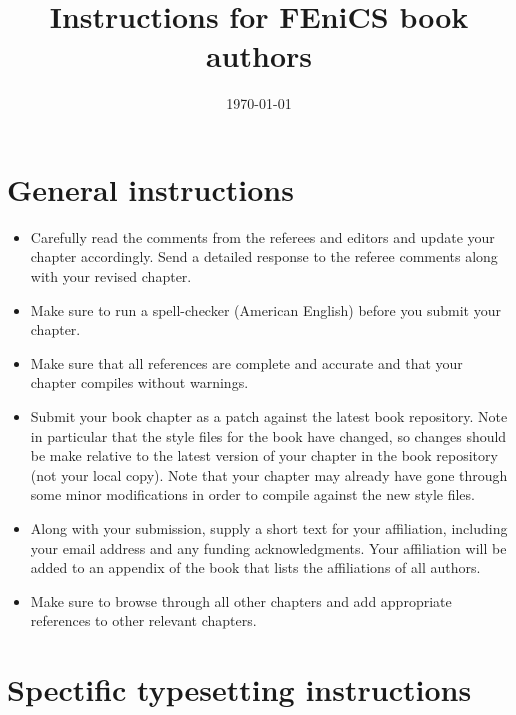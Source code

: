 \documentclass{article}
\title{Instructions for FEniCS book authors}
\date{\today}
\begin{document}
\maketitle

\section*{General instructions}

\begin{itemize}
\item
  Carefully read the comments from the referees and editors and update
  your chapter accordingly. Send a detailed response to the referee
  comments along with your revised chapter.
\item
  Make sure to run a spell-checker (American English) before you
  submit your chapter.
\item
  Make sure that all references are complete and accurate and that
  your chapter compiles without warnings.
\item
  Submit your book chapter as a patch against the latest book
  repository. Note in particular that the style files for the book
  have changed, so changes should be make relative to the latest
  version of your chapter in the book repository (not your local
  copy). Note that your chapter may already have gone through some
  minor modifications in order to compile against the new style files.
\item
  Along with your submission, supply a short text for your
  affiliation, including your email address and any funding
  acknowledgments. Your affiliation will be added to an appendix of
  the book that lists the affiliations of all authors.
\item
  Make sure to browse through all other chapters and add appropriate
  references to other relevant chapters.
\end{itemize}

\section*{Spectific typesetting instructions}
\end{document}
